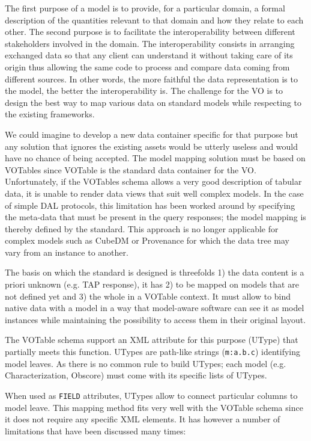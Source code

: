 
The first purpose of a model is to provide, for a particular domain, a formal description of the quantities relevant to that domain and how they relate to each other.
The second purpose is to facilitate the interoperability between  different stakeholders involved in the domain. The interoperability consists in arranging exchanged data 
so that any client can understand it without taking care of its origin thus allowing the same code to process and compare data coming from different sources.  
In other words, the more faithful the data representation is to the model, the better the interoperability is.
The challenge for the VO is to design the best way to map various data on standard models while respecting to the existing frameworks.

We could imagine to develop a new data container specific for that purpose but any solution that ignores the existing assets would be utterly useless and would have no chance of being accepted.
The model mapping solution must be based on VOTables since VOTable  \citep{2019ivoa.spec.1021O} is the standard data container for the VO.
Unfortunately, if the VOTables schema allows a very good description of tabular data, it is unable to render data views that suit well complex models.
In the case of simple DAL protocols, this limitation has been worked around by specifying the meta-data that must be present in the query responses; the model mapping is thereby defined by the standard.
This approach is no longer applicable for complex models such as CubeDM or Provenance for which the data tree may vary from an instance to another.

The basis on which the standard is designed is threefolds 1) the data content is a priori unknown (e.g. TAP response), it has 2) to be mapped on models that are not defined yet and 3) the whole in a VOTable context.
It must allow to bind native data with a model in a way that model-aware software can see it as 
model instances while maintaining the possibility to access them in their original layout.

The VOTable schema support an XML attribute for this purpose (UType) that partially meets this function. 
UTypes are path-like strings (\texttt{m:a.b.c}) identifying model leaves. As there is no common rule to build UTypes; each model (e.g. Characterization, Obscore)  must come with its specific lists of UTypes. 

When used as \texttt{FIELD} attributes, UTypes allow to connect particular columns to model leave. This mapping method fits very well with the VOTable schema since it does not require any specific XML elements. It has however a number of limitations that have been discussed many times:

